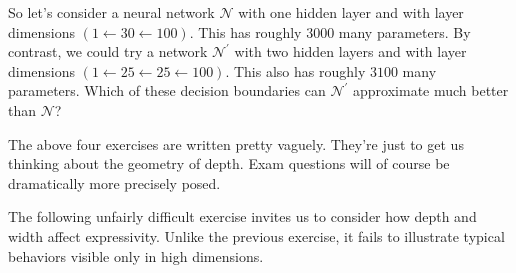 \documentclass[11pt, justified]{tufte-book}
\newcommand{\pr}{\prime}
\theoremstyle{definition}
\begin{document}
        So let's
          consider a neural network $\mathcal{N}$ with one hidden layer and with
          layer dimensions $(1 \leftarrow 30 \leftarrow 100)$.
          This has roughly $3000$ many parameters.
          By contrast, we could try a network $\mathcal{N}^\pr$ with two hidden layers
          and with layer dimensions $(1 \leftarrow 25 \leftarrow 25 \leftarrow
          100)$.  This also has roughly $3100$ many parameters.
        Which of these decision boundaries can $\mathcal{N}^\pr$ approximate
        much better than $\mathcal{N}$?

        The above four exercises are written pretty vaguely.  They're just to 
        get us thinking about the geometry of depth.  Exam questions will of
        course be dramatically more precisely posed.

        \newpage
        The following unfairly difficult exercise invites us to consider how
        depth and width affect expressivity.  Unlike the previous exercise, it
        fails to illustrate typical behaviors visible only in high dimensions.
\end{document}
